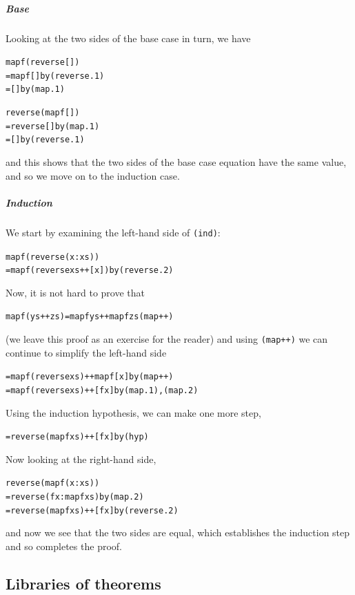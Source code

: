 \subparagraph{Base} Looking at the two sides of the base case in turn, we
have
\begin{alltt}
map f (reverse [])
  = map f [] \hfill {\rm by} (reverse.1)
  = [] \hfill {\rm by} (map.1)

reverse (map f [])
  = reverse [] \hfill {\rm by} (map.1)
  = [] \hfill {\rm by} (reverse.1)
\end{alltt}
and this shows that the two sides of the base case equation have the same value, and so
we move on to the induction case.

\subparagraph{Induction} 
We start by examining the left-hand side of \texttt{(ind)}:
\begin{alltt}
map f (reverse (x:xs)) 
  = map f (reverse xs ++ [x])\hfill {\rm by} (reverse.2)
\end{alltt}
Now, it is not hard to prove that
\begin{alltt}
map f (ys++zs) = map f ys ++ map f zs\hfill (map++)
\end{alltt}
(we leave this proof as an exercise for the reader)
and using \texttt{(map++)} we can continue to simplify the left-hand side
\begin{alltt}
  = map f (reverse xs) ++ map f [x] \hfill {\rm by} (map++)
  = map f (reverse xs) ++ [f x]  \hfill {\rm by} (map.1),(map.2)
\end{alltt}
Using the induction hypothesis, we can make one more step,
\begin{alltt}
  = reverse (map f xs) ++ [f x]\hfill {\rm by} (hyp)
\end{alltt}
Now looking at the right-hand side,
\begin{alltt}
reverse (map f (x:xs))
  = reverse (f x : map f xs) \hfill {\rm by} (map.2)
  = reverse (map f xs) ++ [f x]\hfill {\rm by} (reverse.2) 
\end{alltt}
and now we see that the two sides are equal, which establishes the
induction step and so completes the proof. \blackbox
{}

\subsection*{Libraries of theorems}

